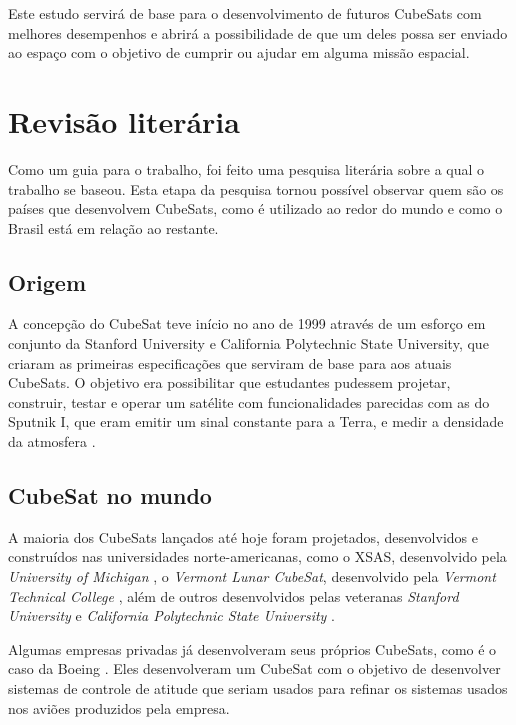 \documentclass[
	12pt,				%
	openany,			%
	twoside,			%
	a4paper,			%
	english,			%
	french,				%
	spanish,			%
	brazil,				%
	oldfontcommands
	]{abntex2}
\begin{document}
Este estudo servirá de base para o desenvolvimento de futuros CubeSats com melhores desempenhos e abrirá a possibilidade de que um deles possa ser enviado ao espaço com o objetivo de cumprir ou ajudar em alguma missão espacial.


\chapter[Revisão literária]{Revisão literária}

Como um guia para o trabalho, foi feito uma pesquisa literária sobre a qual o trabalho se baseou. Esta etapa da pesquisa tornou possível observar quem são os países que desenvolvem CubeSats, como é utilizado ao redor do mundo e como o Brasil está em relação ao restante.

\section[Origem]{Origem}

A concepção do CubeSat teve início no ano de 1999 através de um esforço em conjunto da Stanford University e California Polytechnic State University, que criaram as primeiras especificações que serviram de base para aos atuais CubeSats. O objetivo era possibilitar que estudantes pudessem projetar, construir, testar e operar um satélite com funcionalidades parecidas com as do Sputnik I, que eram emitir um sinal constante para a Terra, e medir a densidade da atmosfera \cite{SmallSat}.

\section[CubeSat no mundo]{CubeSat no mundo} 

A maioria dos CubeSats lançados até hoje foram projetados, desenvolvidos e construídos nas universidades norte-americanas, como o XSAS, desenvolvido pela \textit{University of Michigan} \cite{MCKAY}, o \textit{Vermont Lunar CubeSat}, desenvolvido pela \textit{Vermont Technical College} \cite{Vermont}, além de outros desenvolvidos pelas veteranas \textit{Stanford University} \cite{TWIGGS} e \textit{California Polytechnic State University} \cite{PolySat}.

Algumas empresas privadas já desenvolveram seus próprios CubeSats, como é o caso da Boeing \cite{Boeing}. Eles desenvolveram um CubeSat com o objetivo de desenvolver sistemas de controle de atitude que seriam usados para refinar os sistemas usados nos aviões produzidos pela empresa.
\end{document}
